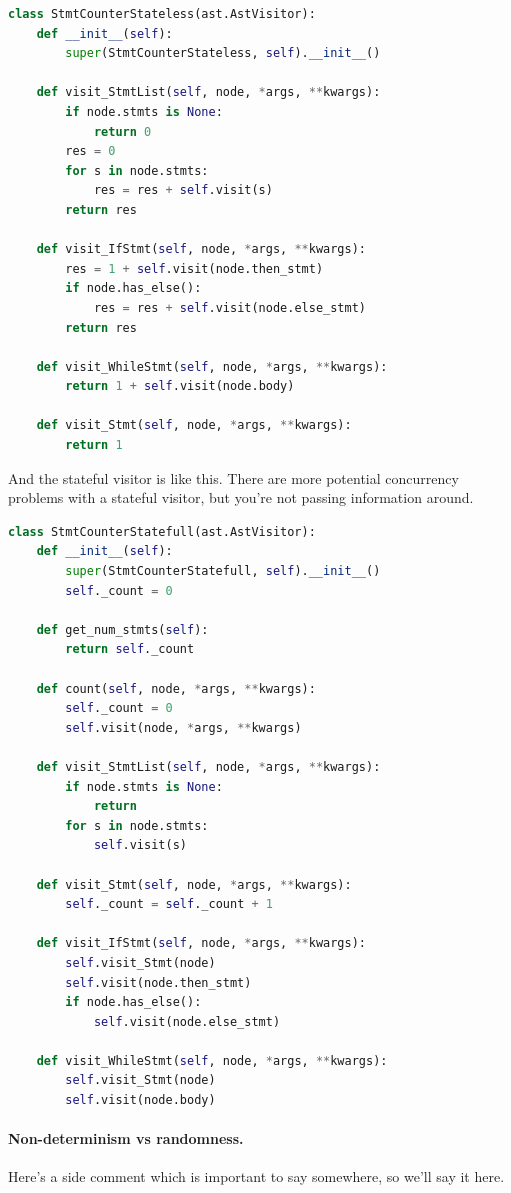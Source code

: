\documentclass[11pt]{article}
\begin{document}
\begin{lstlisting}[language=Python]
class StmtCounterStateless(ast.AstVisitor):
    def __init__(self):
        super(StmtCounterStateless, self).__init__()

    def visit_StmtList(self, node, *args, **kwargs):
        if node.stmts is None:
            return 0
        res = 0
        for s in node.stmts:
            res = res + self.visit(s)
        return res

    def visit_IfStmt(self, node, *args, **kwargs):
        res = 1 + self.visit(node.then_stmt)
        if node.has_else():
            res = res + self.visit(node.else_stmt)
        return res

    def visit_WhileStmt(self, node, *args, **kwargs):
        return 1 + self.visit(node.body)

    def visit_Stmt(self, node, *args, **kwargs):
        return 1
\end{lstlisting}

And the stateful visitor is like this. There are more potential concurrency problems with a stateful visitor,
but you're not passing information around.

\begin{lstlisting}[language=Python]
class StmtCounterStatefull(ast.AstVisitor):
    def __init__(self):
        super(StmtCounterStatefull, self).__init__()
        self._count = 0

    def get_num_stmts(self):
        return self._count

    def count(self, node, *args, **kwargs):
        self._count = 0
        self.visit(node, *args, **kwargs)

    def visit_StmtList(self, node, *args, **kwargs):
        if node.stmts is None:
            return
        for s in node.stmts:
            self.visit(s)

    def visit_Stmt(self, node, *args, **kwargs):
        self._count = self._count + 1

    def visit_IfStmt(self, node, *args, **kwargs):
        self.visit_Stmt(node)
        self.visit(node.then_stmt)
        if node.has_else():
            self.visit(node.else_stmt)

    def visit_WhileStmt(self, node, *args, **kwargs):
        self.visit_Stmt(node)
        self.visit(node.body)
\end{lstlisting}

\paragraph{Non-determinism vs randomness.} Here's a side comment which is important to say somewhere, so we'll say
it here.
\end{document}
